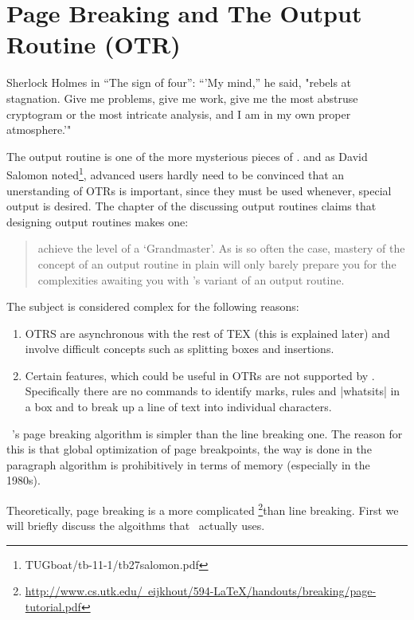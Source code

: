 \chapter{Page Breaking and The Output Routine (OTR)}


\label{ch:OTR}

\epigraph{Sherlock Holmes in ``The sign of four'': ``'My mind,'' he said, "rebels at stagnation. Give me problems, give me work, give me the most abstruse cryptogram or the most intricate analysis, and I am in my own proper atmosphere.'" }{}


The output routine is one of the more mysterious pieces
of \tex.
and as  David Salomon noted\footnote{TUGboat/tb-11-1/tb27salomon.pdf}, advanced users hardly need to be convinced that an unerstanding of OTRs is important, since they must be used whenever, special output is desired.
 The chapter of the \texbook discussing output
routines claims that designing output routines makes one:

\begin{quote}
achieve the level of a `\tex Grandmaster'.
As is so often the case, mastery of the concept of an
output routine in plain \tex will only barely prepare you
for the complexities awaiting you with \latexe's variant of
an output routine.
\end{quote}


The subject is considered complex for the following reasons:

\begin{enumerate}
\item OTRS are asynchronous with the
rest of TEX (this is explained later) and involve difficult concepts such as splitting boxes and insertions.
\item Certain features, which could be useful in OTRs are not supported by \tex. Specifically there are no commands to identify marks, rules and |whatsits| in a box and to break up a line of text into individual characters.
\end{enumerate}

\tex\ 's page breaking algorithm is simpler than the line breaking one. The reason for this is that global optimization
of page breakpoints, the way is done in the paragraph algorithm is prohibitively in terms of memory (especially in the 1980s).

Theoretically, page breaking is a more complicated \footnote{\href{test}{http://www.cs.utk.edu/~eijkhout/594-LaTeX/handouts/breaking/page-tutorial.pdf}}than line breaking. First we will briefly discuss the algoithms that \tex\ actually
uses.


